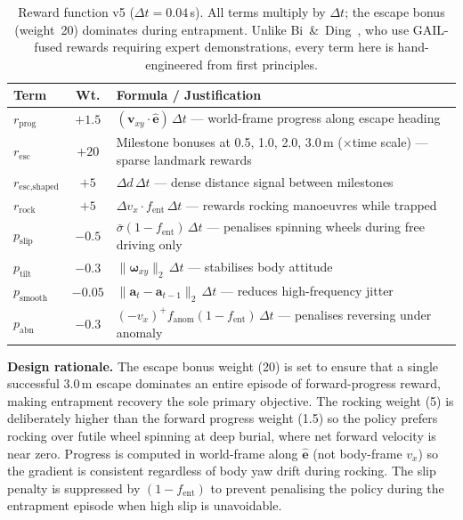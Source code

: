 \documentclass[conference]{IEEEtran}
\begin{document}
\begin{table}[t]
  \centering
  \caption{Reward function v5 ($\Delta t{=}0.04$\,s). All terms multiply by $\Delta t$;
    the escape bonus (weight~20) dominates during entrapment. Unlike
    Bi~\&~Ding~\cite{bi2026escape}, who use GAIL-fused rewards requiring expert
    demonstrations, every term here is hand-engineered from first principles.}
  \label{tab:reward}
  \renewcommand{\arraystretch}{1.25}
  \begin{tabular}{@{}lcp{4.0cm}@{}}
    \toprule
    \textbf{Term} & \textbf{Wt.} & \textbf{Formula / Justification} \\
    \midrule
    $r_{\text{prog}}$
      & $+1.5$
      & $(\mathbf{v}_{xy} \cdot \hat{\mathbf{e}})\,\Delta t$
        — world-frame progress along escape heading \\[2pt]
    $r_{\text{esc}}$
      & $+20$
      & Milestone bonuses at 0.5, 1.0, 2.0, 3.0\,m ($\times$time scale)
        — sparse landmark rewards \\[2pt]
    $r_{\text{esc,shaped}}$
      & $+5$
      & $\Delta d \,\Delta t$ — dense distance signal between milestones \\[2pt]
    $r_{\text{rock}}$
      & $+5$
      & $\Delta v_x \cdot f_\text{ent}\,\Delta t$ — rewards rocking
        manoeuvres while trapped \\[2pt]
    $p_{\text{slip}}$
      & $-0.5$
      & $\bar{\sigma}(1{-}f_\text{ent})\,\Delta t$ — penalises spinning wheels
        during free driving only \\[2pt]
    $p_{\text{tilt}}$
      & $-0.3$
      & $\|\boldsymbol{\omega}_{xy}\|_2\,\Delta t$
        — stabilises body attitude \\[2pt]
    $p_{\text{smooth}}$
      & $-0.05$
      & $\|\mathbf{a}_t {-} \mathbf{a}_{t-1}\|_2\,\Delta t$
        — reduces high-frequency jitter \\[2pt]
    $p_{\text{abn}}$
      & $-0.3$
      & $(-v_x)^+\! f_\text{anom}(1{-}f_\text{ent})\,\Delta t$
        — penalises reversing under anomaly \\
    \bottomrule
  \end{tabular}
\end{table}

\textbf{Design rationale.}
The escape bonus weight (20) is set to ensure that a single successful
3.0\,m escape dominates an entire episode of forward-progress reward, making
entrapment recovery the sole primary objective. The rocking weight (5) is
deliberately higher than the forward progress weight (1.5) so the policy prefers
rocking over futile wheel spinning at deep burial, where net forward velocity is
near zero. Progress is computed in world-frame along $\hat{\mathbf{e}}$ (not
body-frame $v_x$) so the gradient is consistent regardless of body yaw drift
during rocking. The slip penalty is suppressed by $(1{-}f_\text{ent})$ to prevent
penalising the policy during the entrapment episode when high slip is unavoidable.
\end{document}

